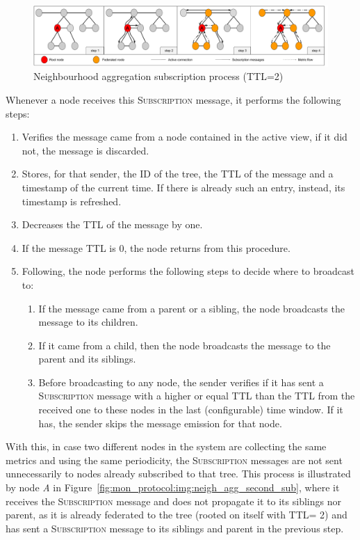 \begin{figure}[htbp]
    \centering
    \includegraphics[width=\textwidth]{Chapters/aggregation/images/neigh-agg-subscribe.pdf}
    \caption{Neighbourhood aggregation subscription process (TTL=2)}
    \label{fig:mon_protocol:img:neigh_agg_sub}
\end{figure}
     
Whenever a node receives this \textsc{Subscription} message, it performs the following steps:

\begin{enumerate} \label{sec:mon_protocol:enum:neigh_agg_sub_opts}
    \item Verifies the message came from a node contained in the active view, if it did not, the message is discarded.
    \item Stores, for that sender, the ID of the tree, the TTL of the message and a timestamp of the current time. If there is already such an entry, instead, its timestamp is refreshed.
    \item Decreases the TTL of the message by one.
    \item If the message TTL is 0, the node returns from this procedure.
    \item Following, the node performs the following steps to decide where to broadcast to:
            \begin{enumerate}
                \item If the message came from a parent or a sibling, the node broadcasts the message to its children.
                \item If it came from a child, then the node broadcasts the message to the parent and its siblings.
                \item Before broadcasting to any node, the sender verifies if it has sent a \textsc{Subscription} message with a higher or equal TTL than the TTL from the received one to these nodes in the last (configurable) time window. If it has, the sender skips the message emission for that node.
            \end{enumerate}
\end{enumerate}

With this, in case two different nodes in the system are collecting the same metrics and using the same periodicity, the \textsc{Subscription} messages are not sent unnecessarily to nodes already subscribed to that tree. This process is illustrated by node \textit{A} in Figure~\ref{fig:mon_protocol:img:neigh_agg_second_sub}, where it receives the \textsc{Subscription} message and does not propagate it to its siblings nor parent, as it is already federated to the tree (rooted on itself with TTL= 2) and has sent a \textsc{Subscription} message to its siblings and parent in the previous step.

